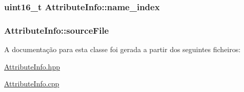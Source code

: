 \subsubsection[{\texorpdfstring{name\+\_\+index}{name_index}}]{\setlength{\rightskip}{0pt plus 5cm}uint16\+\_\+t Attribute\+Info\+::name\+\_\+index}\hypertarget{class_attribute_info_a149c8bb83a448635fe1deb8d898c6efa}{}\label{class_attribute_info_a149c8bb83a448635fe1deb8d898c6efa}
\subsubsection[{\texorpdfstring{source\+File}{sourceFile}}]{ Attribute\+Info\+::source\+File}\hypertarget{class_attribute_info_afcfcce1e1e4ea2a3461a00dd724847ac}{}\label{class_attribute_info_afcfcce1e1e4ea2a3461a00dd724847ac}


A documentação para esta classe foi gerada a partir dos seguintes ficheiros\+:\begin{DoxyCompactItemize}
\item 
\hyperlink{_attribute_info_8hpp}{Attribute\+Info.\+hpp}\item 
\hyperlink{_attribute_info_8cpp}{Attribute\+Info.\+cpp}\end{DoxyCompactItemize}
